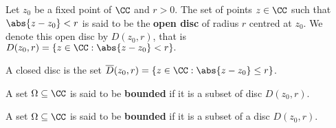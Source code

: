 \documentclass[12pt, a4paper]{article}
\begin{document}
\begin{figure}[H]
    \centering
        \qquad \qquad
\end{figure}

\begin{definition}
    Let \(z_0\) be a fixed point of \(\CC\) and \(r >0\). The set of points \(z \in \CC\) such that \(\abs{z-z_0} <r\) is said to be the \textbf{open disc} of radius \(r\) centred at \(z_0\). We denote this open disc by \(D(z_0,r)\), that is \(D(z_0,r) = \{z \in \CC : \abs{z-z_0} <r\}.\)
\end{definition}

\begin{definition}
    A closed disc is the set \(\overline{D}(z_0,r) = \{z \in \CC : \abs{z-z_0} \leq r\}\).
\end{definition}

\begin{definition}
    A set \(\Omega \subseteq \CC\) is said to be \textbf{bounded} if it is a subset of disc \(D(z_0,r)\).
\end{definition}

\begin{definition}
    A set \(\Omega \subseteq \CC\) is said to be \textbf{bounded} if it is a subset of a disc \(D(z_0,r)\).
\end{definition}
\end{document}
